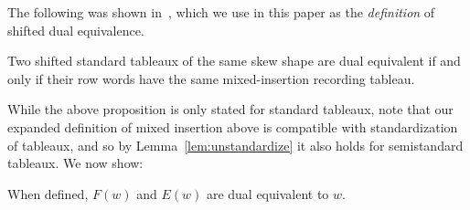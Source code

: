 \documentclass[ALCO,ThmDefs,Unicode,epreuves]{cedram}
\begin{document}
The following was shown in~\cite{Haiman}, which we use in this paper as the \emph{definition} of shifted dual equivalence.

\begin{prop} \label{prop:Haiman1}
Two shifted standard tableaux of the same skew shape are dual equivalent if and only if their row words have the same mixed-insertion recording tableau.
\end{prop}

While the above proposition is only stated for standard tableaux, note that our expanded definition of mixed insertion above is compatible with standardization of tableaux, and so by Lemma~\ref{lem:unstandardize} it also holds for semistandard tableaux. We now show:

\begin{prop}
When defined, $F(w)$ and $E(w)$ are dual equivalent to $w$.
\end{prop}
\end{document}
